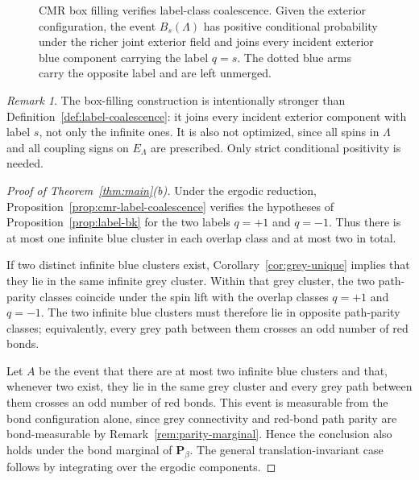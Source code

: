 \documentclass[11pt]{article}
\numberwithin{theorem}{section}
\theoremstyle{remark}
\newtheorem{remark}[theorem]{Remark}
\begin{document}
\begin{figure}[H]
\caption{CMR box filling verifies label-class coalescence. Given the exterior configuration, the event $B_s(\Lambda)$ has positive conditional probability under the richer joint exterior field and joins every incident exterior blue component carrying the label $q=s$. The dotted blue arms carry the opposite label and are left unmerged.}
\label{fig:box-resampling}
\end{figure}

\begin{remark}
The box-filling construction is intentionally stronger than Definition~\ref{def:label-coalescence}: it joins every incident exterior component with label $s$, not only the infinite ones.
It is also not optimized, since all spins in $\Lambda$ and all coupling signs on $E_\Lambda$ are prescribed.
Only strict conditional positivity is needed.
\end{remark}

\begin{proof}[Proof of Theorem~\ref{thm:main}\textup{(b)}]
Under the ergodic reduction, Proposition~\ref{prop:cmr-label-coalescence} verifies the hypotheses of Proposition~\ref{prop:label-bk} for the two labels $q=+1$ and $q=-1$.
Thus there is at most one infinite blue cluster in each overlap class and at most two in total.

If two distinct infinite blue clusters exist, Corollary~\ref{cor:grey-unique} implies that they lie in the same infinite grey cluster.
Within that grey cluster, the two path-parity classes coincide under the spin lift with the overlap classes $q=+1$ and $q=-1$.
The two infinite blue clusters must therefore lie in opposite path-parity classes; equivalently, every grey path between them crosses an odd number of red bonds.

Let $A$ be the event that there are at most two infinite blue clusters and that, whenever two exist, they lie in the same grey cluster and every grey path between them crosses an odd number of red bonds.
This event is measurable from the bond configuration alone, since grey connectivity and red-bond path parity are bond-measurable by Remark~\ref{rem:parity-marginal}.
Hence the conclusion also holds under the bond marginal of $\mathbf{P}_\beta$.
The general translation-invariant case follows by integrating over the ergodic components.
\end{proof}
\end{document}
